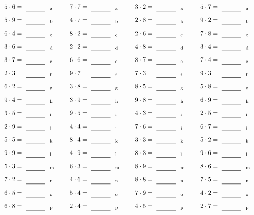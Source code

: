 \documentclass
[
  draft    = true,
  fontsize = 11pt,
  parskip  = half-
]
{scrartcl}
\begin{document}
\par\vfill\par
\begin{align*}
    \pline{5\cdot6}&=\rline{a}
  & \pline{7\cdot7}&=\rline{a}
  & \pline{3\cdot2}&=\rline{a}
  & \pline{5\cdot7}&=\rline{a} \\[1ex]
    \pline{5\cdot9}&=\rline{b}
  & \pline{4\cdot7}&=\rline{b}
  & \pline{2\cdot8}&=\rline{b}
  & \pline{9\cdot2}&=\rline{b} \\[1ex]
    \pline{6\cdot4}&=\rline{c}
  & \pline{8\cdot2}&=\rline{c}
  & \pline{2\cdot6}&=\rline{c}
  & \pline{7\cdot8}&=\rline{c} \\[1ex]
    \pline{3\cdot6}&=\rline{d}
  & \pline{2\cdot2}&=\rline{d}
  & \pline{4\cdot8}&=\rline{d}
  & \pline{3\cdot4}&=\rline{d} \\[1ex]
    \pline{3\cdot7}&=\rline{e}
  & \pline{6\cdot6}&=\rline{e}
  & \pline{8\cdot7}&=\rline{e}
  & \pline{7\cdot4}&=\rline{e} \\[1ex]
    \pline{2\cdot3}&=\rline{f}
  & \pline{9\cdot7}&=\rline{f}
  & \pline{7\cdot3}&=\rline{f}
  & \pline{9\cdot3}&=\rline{f} \\[1ex]
    \pline{6\cdot2}&=\rline{g}
  & \pline{3\cdot8}&=\rline{g}
  & \pline{8\cdot5}&=\rline{g}
  & \pline{5\cdot8}&=\rline{g} \\[1ex]
    \pline{9\cdot4}&=\rline{h}
  & \pline{3\cdot9}&=\rline{h}
  & \pline{9\cdot8}&=\rline{h}
  & \pline{6\cdot9}&=\rline{h} \\[1ex]
    \pline{3\cdot5}&=\rline{i}
  & \pline{9\cdot5}&=\rline{i}
  & \pline{4\cdot3}&=\rline{i}
  & \pline{2\cdot5}&=\rline{i} \\[1ex]
    \pline{2\cdot9}&=\rline{j}
  & \pline{4\cdot4}&=\rline{j}
  & \pline{7\cdot6}&=\rline{j}
  & \pline{6\cdot7}&=\rline{j} \\[1ex]
    \pline{5\cdot5}&=\rline{k}
  & \pline{8\cdot4}&=\rline{k}
  & \pline{3\cdot3}&=\rline{k}
  & \pline{5\cdot2}&=\rline{k} \\[1ex]
    \pline{9\cdot9}&=\rline{l}
  & \pline{4\cdot9}&=\rline{l}
  & \pline{8\cdot3}&=\rline{l}
  & \pline{9\cdot6}&=\rline{l} \\[1ex]
    \pline{5\cdot3}&=\rline{m}
  & \pline{6\cdot3}&=\rline{m}
  & \pline{8\cdot9}&=\rline{m}
  & \pline{8\cdot6}&=\rline{m} \\[1ex]
    \pline{7\cdot2}&=\rline{n}
  & \pline{4\cdot6}&=\rline{n}
  & \pline{8\cdot8}&=\rline{n}
  & \pline{7\cdot5}&=\rline{n} \\[1ex]
    \pline{6\cdot5}&=\rline{o}
  & \pline{5\cdot4}&=\rline{o}
  & \pline{7\cdot9}&=\rline{o}
  & \pline{4\cdot2}&=\rline{o} \\[1ex]
    \pline{6\cdot8}&=\rline{p}
  & \pline{2\cdot4}&=\rline{p}
  & \pline{4\cdot5}&=\rline{p}
  & \pline{2\cdot7}&=\rline{p}
\end{align*}
\end{document}

